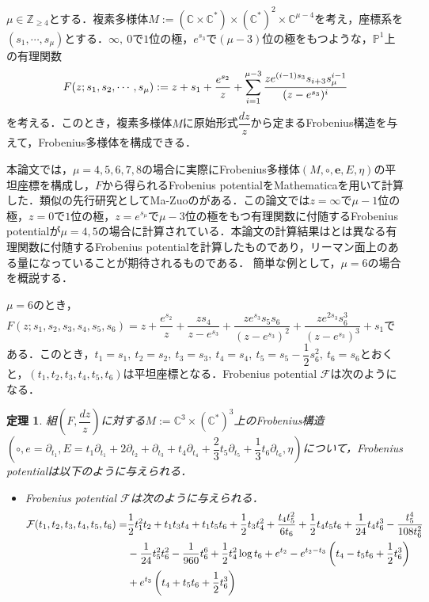 \documentclass[a4paper,11pt]{jbook}
\theoremstyle{plain}
\newtheorem*{thm*}{定理}
\theoremstyle{definition}
\theoremstyle{remark}
\theoremstyle{proof}
\numberwithin{equation}{section}
\def\CC{{\mathbb C}}
\def\PP{{\mathbb P}}
\def\ZZ{{\mathbb Z}}
\def\F{{\mathcal F}}
\begin{document}
	$\mu\in\ZZ_{\geq 4}$とする．複素多様体$M:=(\CC\times\CC^*)\times(\CC^*)^{2}\times\CC^{\mu-4}$を考え，座標系を$(s_1, \cdots, s_\mu)$とする．$\infty,\  0$で$1$位の極，$e^{s_3}$で$(\mu-3)$位の極をもつような，$\PP^1$上の有理関数
\begin{align}
F(z;s_1,s_2,\cdots,s_\mu) := z + s_1 +\frac{e^{s_2}}{z} + \sum_{i=1}^{\mu-3}\frac{ze^{(i-1)s_3}s_{i+3}s_{\mu}^{i-1}}{(z-e^{s_3})^i} \notag
\end{align}
を考える．このとき，複素多様体$M$に原始形式$\dfrac{dz}{z}$から定まるFrobenius構造を与えて，Frobenius多様体を構成できる．

	本論文では，$\mu=4, 5, 6, 7, 8$の場合に実際にFrobenius多様体$(M, \circ, \bm{e}, E, \eta)$の平坦座標を構成し，$F$から得られるFrobenius potentialをMathematicaを用いて計算した．類似の先行研究としてMa-Zuoの\cite{mz}がある．この論文では$z=\infty$で$\mu-1$位の極，$z=0$で$1$位の極，$z=e^{s_\mu}$で$\mu-3$位の極をもつ有理関数に付随するFrobenius potentialが$\mu=4, 5$の場合に計算されている．本論文の計算結果は\cite{mz}とは異なる有理関数に付随するFrobenius potentialを計算したものであり，リーマン面上のある量になっていることが期待されるものである．%
簡単な例として，$\mu=6$の場合を概説する．

	$\mu=6$のとき，$F(z;s_1,s_2,s_3,s_4,s_5,s_6)=z+\dfrac{e^{s_2}}{z}+\dfrac{zs_4}{z-e^{s_3}}+\dfrac{ze^{s_3}s_5s_6}{(z-e^{s_3})^2}+\dfrac{ze^{2s_3}s_6^3}{(z-e^{s_3})^3}+s_1$である．このとき，$t_1=s_1, \ t_2=s_2, \ t_3=s_3, \ t_4=s_4, \ t_5=s_5-\dfrac{1}{2}s_6^2, \ t_6=s_6$とおくと，$(t_1,t_2,t_3,t_4,t_5,t_6)$は平坦座標となる．Frobenius potential $\F$は次のようになる．
\begin{thm*}
組$\left(F,\dfrac{dz}{z}\right)$に対する$M:=\CC^3\times(\CC^*)^3$上の\rm{Frobenius構造}$(\circ,e=\partial_{t_1},E=t_1\partial_{t_1}+2\partial_{t_2}+\partial_{t_3}+t_4\partial_{t_4}+\dfrac{2}{3}t_5\partial_{t_5}+\dfrac{1}{3}t_6\partial_{t_6},\eta)$について，Frobenius potentialは以下のように与えられる．
\begin{itemize}
\item Frobenius potential $\F$は次のように与えられる．
\begin{align*}
	\F(t_1,t_2,t_3,t_4,t_5,t_6)=&\frac{1}{2}t_1^2t_2+t_1t_3t_4+t_1t_5t_6+\frac{1}{2}t_3t_4^2 +\dfrac{t_4t_5^2}{6t_6} + \dfrac{1}{2}t_4t_5t_6 + \frac{1}{24}t_4t_6^3 -\frac{t_5^4}{108t_6^2} \notag \\
&-\frac{1}{24}t_5^2t_6^2-\frac{1}{960}t_6^6 +\dfrac{1}{2}t_4^2\log{t_6}+e^{t_2}-e^{t_2-t_3}\left(t_4-t_5t_6+\dfrac{1}{2}t_6^3\right) \notag \\
&+e^{t_3}\left(t_4+t_5t_6+\dfrac{1}{2}t_6^3\right)
\end{align*}
\end{itemize}
\end{thm*}
	
\end{document}

